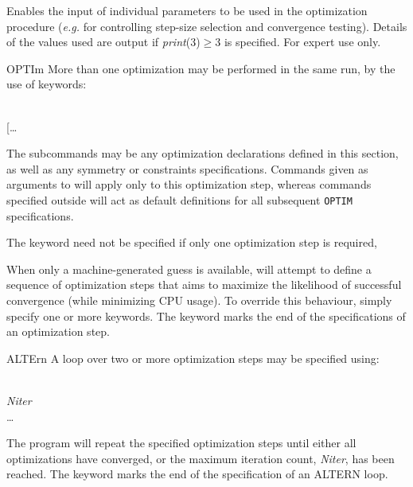 \begin{keywordlist}
Enables the input of individual parameters to be used in the optimization procedure
({\em e.g.}\/ for controlling step-size selection and convergence testing).
Details of the values used are output if {\em print}(3)$\geq$3 is specified.
For expert use only.
\item[OPTIm]
More than one optimization may be performed in the same  run,
by the use of  keywords:

\\
{[}\ldots \\
\keyword{ENDOPTIM}{]}

The subcommands may be any optimization declarations defined in this
section, as well as any symmetry or constraints specifications.
Commands given as arguments to 
will apply only to this optimization step, whereas commands specified
outside will act as default definitions for all subsequent {\tt OPTIM}
specifications.

The  keyword
need not be specified if only one optimization step is required,

When only a machine-generated guess is available,  will
attempt to
define a sequence of optimization steps that aims to maximize the
likelihood of successful convergence (while minimizing
CPU usage). To override this behaviour, simply specify one or more
 keywords. The  keyword marks the end of the
specifications of an optimization step.
\item[ALTErn]
A loop over two or more optimization steps may be specified using:

\\
{\em Niter}\\
\ldots\\

The program will repeat the specified optimization steps
until either all optimizations have converged, or the maximum iteration count,
{\em Niter}, has been reached.
The  keyword marks the end of the specification of an
ALTERN loop.
\end{keywordlist}


